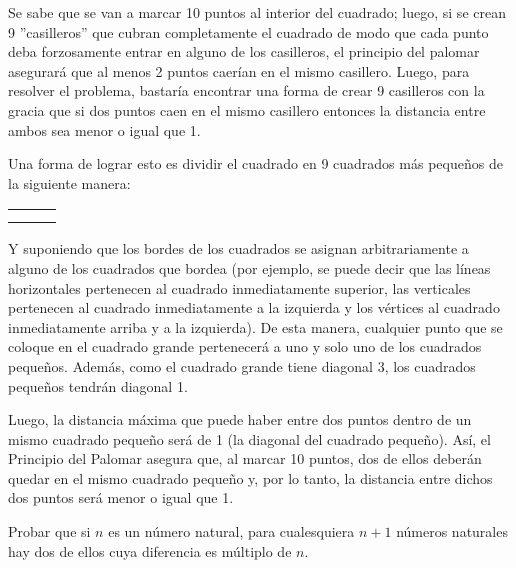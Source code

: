 \begin{solucion}
    Se sabe que se van a marcar 10 puntos al interior del cuadrado; luego, si se crean 9 ''casilleros'' que cubran completamente el cuadrado de modo que cada punto deba forzosamente entrar en alguno de los casilleros, el principio del palomar asegurará que al menos 2 puntos caerían en el mismo casillero. Luego, para resolver el problema, bastaría encontrar una forma de crear 9 casilleros con la gracia que si dos puntos caen en el mismo casillero entonces la distancia entre ambos sea menor o igual que 1.
    
    \newpage
    
    Una forma de lograr esto es dividir el cuadrado en 9 cuadrados más pequeños de la siguiente manera:

    \begin{center}
        \begin{tabular}{|p{0.35cm}|p{0.35cm}|p{0.35cm}|}
        \hline
         &  &  \\ \hline
         &  &  \\ \hline
         &  &  \\ \hline
        \end{tabular}
    \end{center}

    Y suponiendo que los bordes de los cuadrados se asignan arbitrariamente a alguno de los cuadrados que bordea (por ejemplo, se puede decir que las líneas horizontales pertenecen al cuadrado inmediatamente superior, las verticales pertenecen al cuadrado inmediatamente a la izquierda y los vértices al cuadrado inmediatamente arriba y a la izquierda). De esta manera, cualquier punto que se coloque en el cuadrado grande pertenecerá a uno y solo uno de los cuadrados pequeños. Además, como el cuadrado grande tiene diagonal 3, los cuadrados pequeños tendrán diagonal 1.

    Luego, la distancia máxima que puede haber entre dos puntos dentro de un mismo cuadrado pequeño será de 1 (la diagonal del cuadrado pequeño). Así, el Principio del Palomar asegura que, al marcar 10 puntos, dos de ellos deberán quedar en el mismo cuadrado pequeño y, por lo tanto, la distancia entre dichos dos puntos será menor o igual que 1.
\end{solucion}

\begin{ejemplo}
    Probar que si $n$ es un número natural, para cualesquiera $n+1$ números naturales hay dos de ellos cuya diferencia es múltiplo de $n$.
\end{ejemplo}

